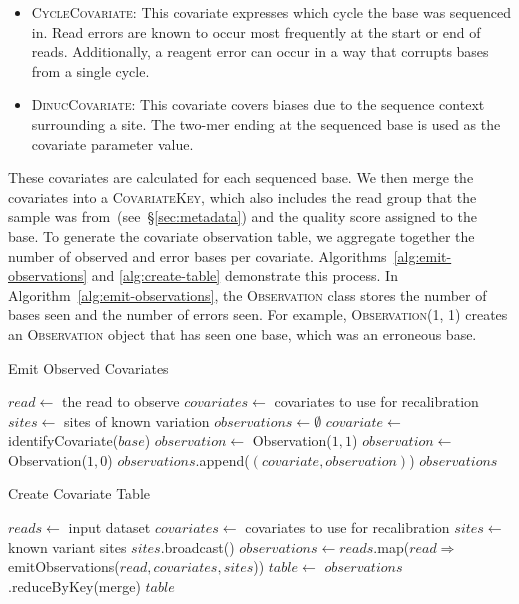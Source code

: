 \documentclass[phd]{ucbthesis}
\begin{document}
\begin{itemize}
\item \textsc{CycleCovariate}: This covariate expresses which cycle the base was
  sequenced in. Read errors are known to occur most frequently at the start or
  end of reads. Additionally, a reagent error can occur in a way that corrupts
  bases from a single cycle.
\item \textsc{DinucCovariate}: This covariate covers biases due to the sequence
  context surrounding a site. The two-mer ending at the sequenced base is used
  as the covariate parameter value.
\end{itemize}

These covariates are calculated for each sequenced base. We then merge the
covariates into a \textsc{CovariateKey}, which also includes the read group
that the sample was from~(see~\S\ref{sec:metadata}) and the quality score
assigned to the base. To generate the covariate observation table, we
aggregate together the number of observed and error bases per covariate.
Algorithms~\ref{alg:emit-observations} and \ref{alg:create-table} demonstrate
this process. In Algorithm~\ref{alg:emit-observations}, the \textsc{Observation}
class stores the number of bases seen and the number of errors seen. For
example, \textsc{Observation(1, 1)} creates an \textsc{Observation} object that
has seen one base, which was an erroneous base.

\begin{algorithm}
\caption{Emit Observed Covariates}
\label{alg:emit-observations}
\begin{algorithmic}
\STATE $read \leftarrow$ the read to observe
\STATE $covariates \leftarrow$ covariates to use for recalibration
\STATE $sites \leftarrow$ sites of known variation
\STATE $observations \leftarrow \emptyset$
\STATE $covariate \leftarrow$ identifyCovariate($base$)
\STATE $observation \leftarrow$ Observation($1, 1$)
\ELSE
\STATE $observation \leftarrow$ Observation($1, 0$)
\ENDIF
\STATE $observations$.append($(covariate, observation)$)
\ENDFOR
\RETURN $observations$
\end{algorithmic}
\end{algorithm}

\begin{algorithm}
\caption{Create Covariate Table}
\label{alg:create-table}
\begin{algorithmic}
\STATE $reads \leftarrow$ input dataset
\STATE $covariates \leftarrow$ covariates to use for recalibration
\STATE $sites \leftarrow$ known variant sites
\STATE $sites$.broadcast()
\STATE $observations \leftarrow reads$.map($read \Rightarrow$ emitObservations($read, covariates, sites$))
\STATE $table \leftarrow$ $observations$.reduceByKey(merge)
\RETURN $table$
\end{algorithmic}
\end{algorithm}
\end{document}
